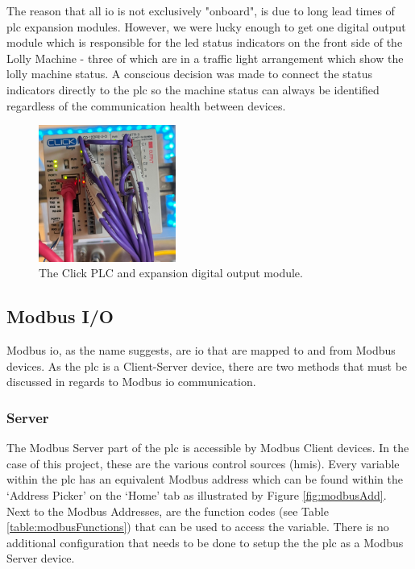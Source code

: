         The reason that all \acrshort{io} is not exclusively "onboard", is due to long lead times of \acrshort{plc} expansion modules. However, we were lucky enough to get one digital output module which is responsible for the \acrshort{led} status indicators on the front side of the Lolly Machine - three of which are in a traffic light arrangement which show the lolly machine status. A conscious decision was made to connect the status indicators directly to the \acrshort{plc} so the machine status can always be identified regardless of the communication health between devices. 

        \begin{figure}[H]
            \centering
            \includegraphics[width = 0.4\textwidth]{2_images/plcInstall}
            \caption{The Click PLC and expansion digital output module.}
            \label{fig:plcInstall}
        \end{figure}
    
    \subsection{Modbus I/O}
        Modbus \acrshort{io}, as the name suggests, are \acrshort{io} that are mapped to and from Modbus devices. As the \acrshort{plc} is a Client-Server device, there are two methods that must be discussed in regards to Modbus \acrshort{io} communication.

        \subsubsection{Server}
            The Modbus Server part of the \acrshort{plc} is accessible by Modbus Client devices. In the case of this project, these are the various control sources (\acrshort{hmi}s). Every variable within the \acrshort{plc} has an equivalent Modbus address which can be found within the `Address Picker' on the `Home' tab as illustrated by Figure \ref{fig:modbusAdd}. Next to the Modbus Addresses, are the function codes (see Table \ref{table:modbusFunctions}) that can be used to access the variable. There is no additional configuration that needs to be done to setup the the \acrshort{plc} as a Modbus Server device. 
            
